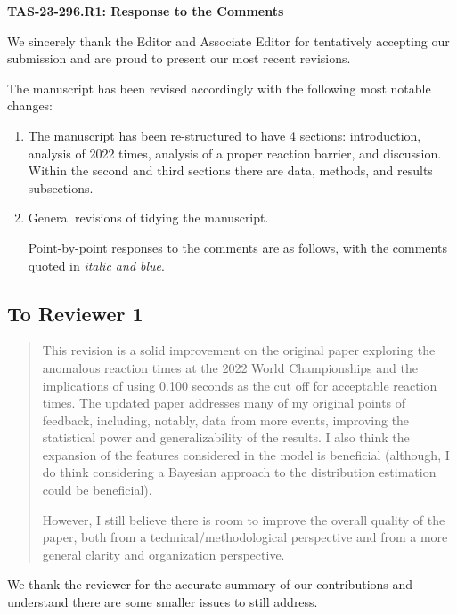 \documentclass[12pt]{article}
\newenvironment{comment}%
{\begin{quotation}\noindent\small\it\color{darkblue}\ignorespaces%
}{\end{quotation}}
\begin{document}
\begin{center}
  {\Large\bf TAS-23-296.R1: Response to the Comments}
\end{center}

We sincerely thank the Editor and Associate Editor for tentatively accepting our
submission and are proud to present our most recent revisions.


The manuscript has been revised accordingly with the following most
notable changes:
\begin{enumerate}
\item
  The manuscript has been re-structured to have 4 sections: introduction,
  analysis of 2022 times, analysis of a proper reaction barrier, and discussion.
  Within the second and third sections there are data, methods, and results
  subsections.
\item
  General revisions of tidying the manuscript.

Point-by-point responses to the comments are as follows, with the
comments quoted in \emph{\color{darkblue} italic and blue}.
\end{enumerate}


\subsection*{To Reviewer 1}

\begin{comment}
This revision is a solid improvement on the original paper exploring the
anomalous reaction times at the 2022 World Championships and the implications of
using 0.100 seconds as the cut off for acceptable reaction times. The updated
paper addresses many of my original points of feedback, including, notably, data
from more events, improving the statistical power and generalizability of the
results. I also think the expansion of the features considered in the model is
beneficial (although, I do think considering a Bayesian approach to the
distribution estimation could be beneficial).

However, I still believe there is room to improve the overall quality of the
paper, both from a technical/methodological perspective and from a more general
clarity and organization perspective.


\end{comment}

We thank the reviewer for the accurate summary of our contributions and
understand there are some smaller issues to still address.
\end{document}
